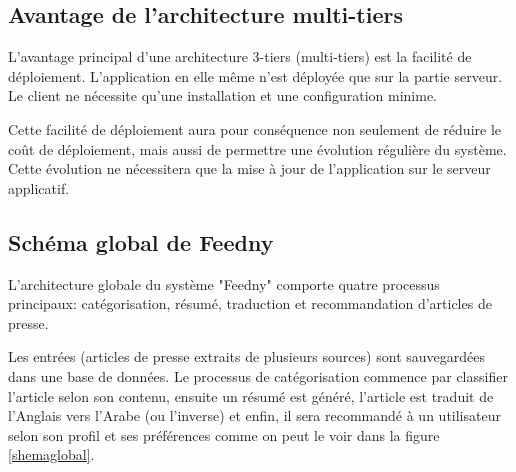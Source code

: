 \subsection{Avantage de l'architecture multi-tiers}
L'avantage principal d'une architecture 3-tiers (multi-tiers) est la facilité de déploiement. L'application
en elle même n'est déployée que sur la partie serveur. Le client ne nécessite qu'une installation et une configuration minime. 

Cette facilité de déploiement aura pour conséquence non seulement de réduire le coût de déploiement, mais aussi de permettre une évolution régulière du système. Cette évolution ne nécessitera que la mise à jour de l'application sur le serveur applicatif.

\subsection{Schéma global de \textquotedbl Feedny\textquotedbl}
L'architecture globale du système "Feedny" comporte quatre processus principaux: catégorisation, résumé, traduction et recommandation d'articles de presse.

Les entrées (articles de presse extraits de plusieurs sources) sont sauvegardées dans une base de données. Le processus de catégorisation commence par classifier l'article selon son contenu, ensuite un résumé est généré, l'article est traduit de l'Anglais vers l'Arabe (ou l'inverse) et enfin, il sera recommandé à un utilisateur selon son profil et ses préférences comme on peut le voir dans la figure \ref{shemaglobal}.

